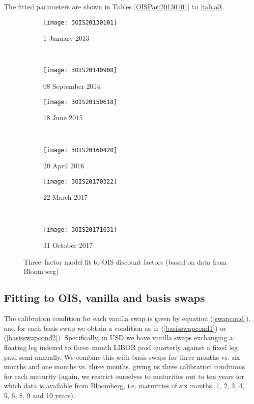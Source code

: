 \documentclass[12pt,a4paper]{article}
\theoremstyle{plain}
\numberwithin{equation}{section}
\begin{document}
The fitted parameters are shown in Tables \ref{OISPar:20130101} to \ref{tab:a0}.
\begin{figure}[t]
  \centering
    \begin{subfigure}[b]{0.53\textwidth}
        \texttt{[image: 3OIS20130101]}
        \caption{1 January 2013}
        \label{fig:ua}
    \end{subfigure}
    ~
    \begin{subfigure}[b]{0.53\textwidth}
        \texttt{[image: 3OIS20140908]}
       \caption{08 September 2014}
        \label{figxajun}
    \end{subfigure}\vspace*{1em}

 \begin{subfigure}[b]{0.53\textwidth}
        \texttt{[image: 3OIS20150618]}
       \caption{18 June 2015}
        \label{figxajun}
    \end{subfigure}
    ~
     \begin{subfigure}[b]{0.53\textwidth}
        \texttt{[image: 3OIS20160420]}
       \caption{20 April 2016}
        \label{figxaapr}
    \end{subfigure}\vspace*{1em}

     \begin{subfigure}[b]{0.53\textwidth}
        \texttt{[image: 3OIS20170322]}
       \caption{22 March 2017}
        \label{figx}
    \end{subfigure}
    ~
     \begin{subfigure}[b]{0.53\textwidth}
        \texttt{[image: 3OIS20171031]}
       \caption{31 October 2017}
        \label{figxa}
    \end{subfigure}
\caption{Three--factor model fit to OIS discount factors (based on data from Bloomberg)}\label{OIS3Factor}
\end{figure}

\subsection{Fitting to OIS, vanilla and basis swaps}\label{OISswapcal}
The calibration condition for each vanilla swap is given by equation (\ref{swapcond}), and for each basis swap we obtain a condition as in (\ref{basisswapcond1}) or (\ref{basisswapcond2}). Specifically, in USD we have vanilla swaps exchanging a floating leg indexed to three--month LIBOR paid quarterly against a fixed leg paid semi-annually. We combine this with basis swaps for three months vs. six months and one months vs. three months, giving us three calibration conditions for each maturity (again, we restrict ourselves to maturities out to ten years for which data is available from Bloomberg, i.e. maturities of six months, 1, 2, 3, 4, 5, 6, 8, 9 and 10 years).
\end{document}
